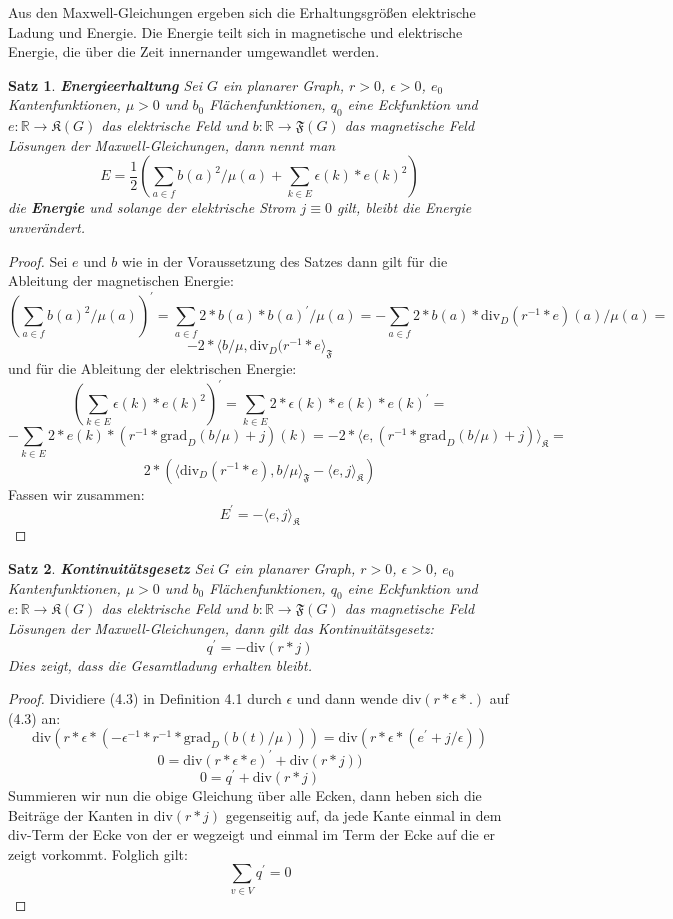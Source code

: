 \documentclass[11pt,a4paper,leqno]{report}
\newtheorem{proposition}{Satz}[chapter]
\numberwithin{equation}{chapter}
\begin{document}
\noindent
Aus den Maxwell-Gleichungen ergeben sich die Erhaltungsgr\"o\ss{}en elektrische Ladung und Energie. Die Energie teilt sich in magnetische und elektrische Energie, die \"uber die Zeit innernander umgewandlet werden.
\begin{proposition}\textbf{Energieerhaltung}
	Sei $G$ ein planarer Graph, $r>0$, $\epsilon>0$, $e_0$ Kantenfunktionen, $\mu>0$ und $b_0$ Fl\"achenfunktionen, $q_0$ eine Eckfunktion und  $e:\mathbb{R}\rightarrow\mathfrak{K}(G)$ das elektrische Feld und $b:\mathbb{R}\rightarrow\mathfrak{F}(G)$ das magnetische Feld L\"osungen der Maxwell-Gleichungen, dann nennt man 
	\begin{equation}
	E = \frac{1}{2}(\sum_{a\in f} b(a)^2 /\mu(a) + \sum_{k\in E} \epsilon(k) * e(k)^2)
	\end{equation}
	die \textbf{Energie} und solange der elektrische Strom $j\equiv 0$ gilt, bleibt die Energie unver\"andert. 
\end{proposition}
\begin{proof}
	Sei $e$ und $b$ wie in der Voraussetzung des Satzes dann gilt f\"ur die Ableitung der magnetischen Energie:
	$$(\sum_{a\in f} b(a)^2 /\mu(a))^\prime = \sum_{a\in f} 2 * b(a) * b(a)^\prime /\mu(a) = -\sum_{a\in f} 2 * b(a) * \text{div}_D(r^{-1} * e)(a) /\mu(a)=$$
	$$-2 * \langle b /\mu, \text{div}_D(r^{-1} * e\rangle_{\mathfrak{F}}$$
	und f\"ur die Ableitung der elektrischen Energie:
	$$(\sum_{k\in E} \epsilon(k) * e(k)^2)^\prime = \sum_{k\in E} 2 * \epsilon(k) * e(k) * e(k)^\prime = $$
	$$-\sum_{k\in E} 2 * e(k) * (r^{-1} * \text{grad}_D(b /\mu) + j) (k)=-2 * \langle e, (r^{-1} * \text{grad}_D(b /\mu) + j) \rangle_{\mathfrak{K}}=$$
	$$2 * (\langle \text{div}_D(r^{-1} * e), b /\mu\rangle_{\mathfrak{F}} - \langle e, j\rangle_{\mathfrak{K}})$$
	Fassen wir zusammen:
	$$E^\prime = -\langle e, j\rangle_{\mathfrak{K}}$$
\end{proof}
\begin{proposition}\textbf{Kontinuit\"atsgesetz}
	Sei $G$ ein planarer Graph, $r>0$, $\epsilon>0$, $e_0$ Kantenfunktionen, $\mu>0$ und $b_0$ Fl\"achenfunktionen, $q_0$ eine Eckfunktion und  $e:\mathbb{R}\rightarrow\mathfrak{K}(G)$ das elektrische Feld und $b:\mathbb{R}\rightarrow\mathfrak{F}(G)$ das magnetische Feld L\"osungen der Maxwell-Gleichungen, dann gilt das Kontinuit\"atsgesetz:
	$$q^\prime = - \text{div}(r*j)$$
	Dies zeigt, dass die Gesamtladung erhalten bleibt.
\end{proposition}
\begin{proof}
	Dividiere (4.3) in Definition 4.1 durch $\epsilon$ und dann wende $\text{div}(r * \epsilon * .)$ auf (4.3) an:
	$$\text{div}(r * \epsilon * (-\epsilon^{-1} * r^{-1} * \text{grad}_D(b(t) / \mu))) = \text{div}(r * \epsilon * (e^\prime + j/\epsilon))$$
	$$0 = \text{div}(r * \epsilon * e)^\prime + \text{div}(r * j))$$
	$$0 = q^\prime + \text{div}(r * j)$$
	Summieren wir nun die obige Gleichung \"uber alle Ecken, dann heben sich die Beitr\"age der Kanten in $\text{div}(r*j)$ gegenseitig auf, da jede Kante einmal in dem $\text{div}$-Term der Ecke von der er wegzeigt und einmal im Term der Ecke auf die er zeigt vorkommt. Folglich gilt:
	$$\sum_{v\in V}q^\prime=0$$
\end{proof}
\end{document}
